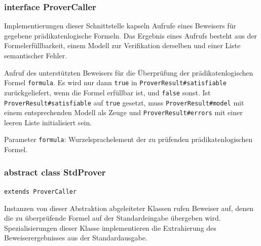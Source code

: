 \subsubsection{interface ProverCaller}%

Implementierungen dieser Schnittstelle kapseln Aufrufe eines Beweisers
für gegebene prädikatenlogische Formeln. Das Ergebnis eines Aufrufs
besteht aus der Formelerfüllbarkeit, einem Modell zur Verifikation
derselben und einer Liste semantischer Fehler.%


\begin{description}%

    Aufruf des unterstützten Beweisers für die Überprüfung der
    prädikatenlogischen Formel \texttt{formula}. Es wird nur dann
    \texttt{true} in \texttt{ProverResult\#satisfiable}
    zurückgeliefert, wenn die Formel erfüllbar ist, und \texttt{false}
    sonst. Ist \texttt{ProverResult\#satisfiable} auf \texttt{true}
    gesetzt, muss \texttt{ProverResult\#model} mit einem
    entsprechenden Modell als Zeuge und \texttt{ProverResult\#errors}
    mit einer leeren Liste initialisiert sein.%

    Parameter \texttt{formula}: Wurzelsprachelement der zu prüfenden
    prädikatenlogischen Formel.%

\end{description}%

\subsubsection{abstract class StdProver}%

\texttt{extends ProverCaller}%

Instanzen von dieser Abstraktion abgeleiteter Klassen rufen Beweiser
auf, denen die zu überprüfende Formel auf der Standardeingabe
übergeben wird. Spezialisierungen dieser Klasse implementieren die
Extrahierung des Beweiserergebnisses aus der Standardausgabe.%


\begin{description}%


\end{description}%



